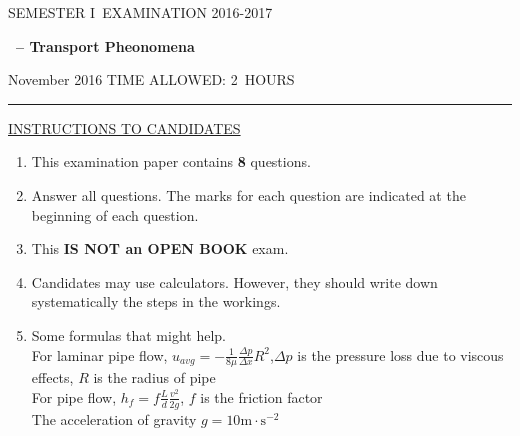 \documentclass[12pt]{article}
\newcommand{\masunitnumber}{}
\newcommand{\examdate}{November 2016}
\newcommand{\academicyear}{2016-2017}
\newcommand{\semester}{I}
\newcommand{\coursename}{Transport Pheonomena}
\newcommand{\numberofhours}{2}
\begin{document}
\setlength{\headsep}{5truemm}
\setlength{\headheight}{14.5truemm}
\setlength{\voffset}{-0.45truein}
\renewcommand{\headrulewidth}{0.0pt}
\begin{center}
SEMESTER \semester\ EXAMINATION \academicyear
\end{center}
\begin{center}
{\bf \masunitnumber\ -- \coursename}
\end{center}
\vspace{20truemm}

\noindent \examdate\hspace{55truemm} TIME ALLOWED: \numberofhours\ HOURS

\vspace{19truemm}
\hrule
\vspace{19truemm}

\noindent\underline{INSTRUCTIONS TO CANDIDATES}
\vspace{8truemm}
\begin{enumerate}
	\item This examination paper contains {\bf 8} questions.
	
	\item Answer all questions. 
	The marks for each question are indicated at the beginning of each question.
	
	
	\item This {\bf IS NOT an OPEN BOOK} exam.
	
	\item Candidates may use calculators. However, they should write down systematically the steps in the workings.
	
	\item Some formulas that might help.\\
	For laminar pipe flow,
	$u_{avg}=-\frac{1}{8\mu}\frac{\Delta p}{\Delta x}R^2$,$\Delta p$ is the pressure loss due to viscous effects, $R$ is the radius of pipe\\
	For pipe flow, $h_f=f\frac{L}{d}\frac{v^2}{2g}$, $f$ is the friction factor\\
	The acceleration of gravity $g=\mathrm{10m\cdot s^{-2}}$\\
\end{enumerate}


\newpage
\lhead{}
\rhead{\masunitnumber}
\chead{}
\lfoot{}
\cfoot{\thepage}
\rfoot{}
\setlength{\footskip}{45pt}
\end{document}
